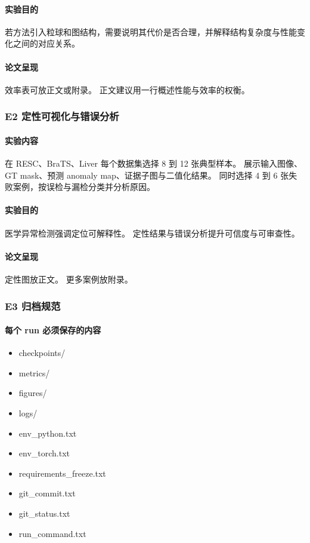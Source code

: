 \documentclass[UTF8,a4paper]{ctexart}
\begin{document}
\paragraph{实验目的}
若方法引入粒球和图结构，需要说明其代价是否合理，并解释结构复杂度与性能变化之间的对应关系。

\paragraph{论文呈现}
效率表可放正文或附录。
正文建议用一行概述性能与效率的权衡。

\subsubsection{E2 定性可视化与错误分析}

\paragraph{实验内容}
在 RESC、BraTS、Liver 每个数据集选择 8 到 12 张典型样本。
展示输入图像、GT mask、预测 anomaly map、证据子图与二值化结果。
同时选择 4 到 6 张失败案例，按误检与漏检分类并分析原因。

\paragraph{实验目的}
医学异常检测强调定位可解释性。
定性结果与错误分析提升可信度与可审查性。

\paragraph{论文呈现}
定性图放正文。
更多案例放附录。

\subsubsection{E3 归档规范}

\paragraph{每个 run 必须保存的内容}
\begin{itemize}
  \item checkpoints/
  \item metrics/
  \item figures/
  \item logs/
  \item env\_python.txt
  \item env\_torch.txt
  \item requirements\_freeze.txt
  \item git\_commit.txt
  \item git\_status.txt
  \item run\_command.txt
\end{itemize}
\end{document}
